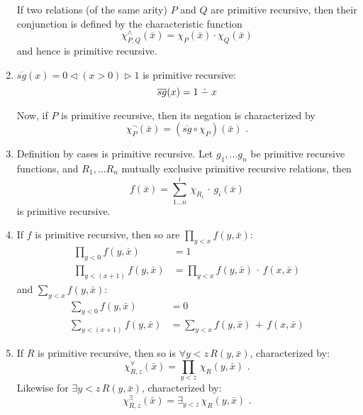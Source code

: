 \documentclass[a4paper,11pt]{article}
\newcommand{\dotmin}{\buildrel\textstyle.\over{\hbox{\vrule height3pt depth0pt width0pt}{\smash-}}}
\begin{document}
\begin{enumerate}
If two relations (of the same arity) $P$ and $Q$ are primitive recursive, then
their conjunction is defined by the characteristic function
\begin{equation*}
  \chi^{\wedge}_{P,Q}(\bar{x}) = \chi_{P}(\bar{x}) \cdot \chi_{Q}(\bar{x})
\end{equation*}
and hence is primitive recursive.


\item %
$\overline{sg}(x) = 0 \lhd (x > 0) \rhd 1$ is primitive recursive:
\begin{equation*}
  \overline{sg}(x) = 1 \dotmin x
\end{equation*}

Now, if $P$ is primitive recursive, then its negation is characterized by
\begin{equation*}
  \chi^{\neg}_{P}(\bar{x}) = (\overline{sg} \circ \chi_P) (\bar{x}) \text{ .}
\end{equation*}


\item %
Definition by cases is primitive recursive. Let $g_1, \ldots g_n$ be primitive
recursive functions, and $R_1, \ldots R_n$ mutually exclusive primitive
recursive relations, then
\begin{equation*}
  f(\bar{x}) = \sum^i_{1 \ldots n} \, \chi_{R_i} \, \cdot \, g_i(\bar{x})
\end{equation*}
is primitive recursive.


\item %
If $f$ is primitive recursive, then so are $\prod_{y < x} f(y, \bar{x})$:
\begin{align*}
  \textstyle{\prod_{y < 0}} f(y, \bar{x})     &= 1\\
  \textstyle{\prod_{y < (x + 1)}} f(y, \bar{x}) &= \textstyle{\prod_{y < x}} f(y, \bar{x}) \, \cdot \, f(x, \bar{x})
\end{align*}
and $\sum_{y < x} f(y, \bar{x})$:
\begin{align*}
  \textstyle{\sum_{y < 0}} f(y, \bar{x})     &= 0\\
  \textstyle{\sum_{y < (x + 1)}} f(y, \bar{x}) &= \textstyle{\sum_{y < x}} f(y, \bar{x}) \, + \, f(x, \bar{x})
\end{align*}


\item %
If $R$ is primitive recursive, then so is $\forall y \! < \! z \, R(y, \bar{x})$, characterized by:
\begin{equation*}
  \chi^{\forall}_{R,z}(\bar{x}) = \textstyle{\prod_{y < z}} \, \chi_R(y, \bar{x}) \text{ .}
\end{equation*}
Likewise for $\exists y \! < \! z \, R(y, \bar{x})$, characterized by:
\begin{equation*}
  \chi^{\exists}_{R,z}(\bar{x}) = \textstyle{\exists_{y < z}} \, \chi_R(y, \bar{x}) \text{ .}
\end{equation*}


\end{enumerate}
\end{document}
